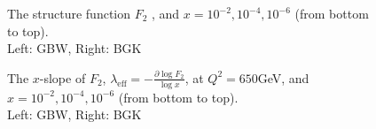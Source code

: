 \documentclass[11pt]{article}
\begin{document}
\begin{figure}[H]
\caption{The structure function $F_2$ , and $x=10^{-2}, 10^{-4}, 10^{-6}$ (from bottom to top).\\Left: GBW, Right: BGK}
\label{F2}
\end{figure}
\begin{figure}[H]
\caption{The $x$-slope of $F_2$,  $\lambda_{\mathrm{eff}}=-\frac{\partial \log F_2}{\log x}$, at $Q^2=650$GeV, and $x=10^{-2},10^{-4}, 10^{-6}$ (from bottom to top).\\Left: GBW, Right: BGK}
\label{slope}
\end{figure}
\end{document}
